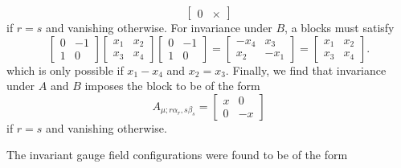 \begin{itemize}
\begin{equation}
\begin{bmatrix}
                            0 & \times
                        \end{bmatrix}
                \end{equation}
                if $r=s$ and vanishing otherwise. For invariance under $B$, a blocks must satisfy
                \begin{equation}
                    \begin{bmatrix}
                        0 & -1 \\
                        1 & 0
                    \end{bmatrix}
                    \begin{bmatrix}
                        x_1 & x_2 \\
                        x_3 & x_4
                    \end{bmatrix}
                    \begin{bmatrix}
                        0 & -1 \\
                        1 & 0
                    \end{bmatrix}=
                    \begin{bmatrix}
                        -x_4 & x_3 \\
                        x_2 & -x_1
                    \end{bmatrix}=
                    \begin{bmatrix}
                        x_1 & x_2 \\
                        x_3 & x_4
                    \end{bmatrix}.
                \end{equation}
                which is only possible if $x_1-x_4$ and $x_2=x_3$. Finally, we find that invariance under $A$ and $B$ imposes the block to be of the form
                \begin{equation}
                    A_{\mu;r\alpha_r,s\beta_s}=
                        \begin{bmatrix}
                            x & 0 \\
                            0 & -x
                        \end{bmatrix}
                \end{equation}
                if $r=s$ and vanishing otherwise.
            \end{itemize}
            The invariant gauge field configurations were found to be of the form
